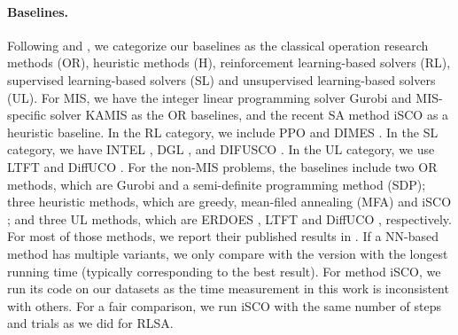 \paragraph{Baselines.}  Following \citet{qiu2022dimes} and \citet{zhang2023let}, we categorize our baselines as the classical operation research methods (OR), heuristic methods (H), reinforcement learning-based  solvers (RL), supervised learning-based solvers (SL) and unsupervised learning-based solvers (UL). For MIS, we have the integer linear programming solver Gurobi \citep{gurobi} and MIS-specific solver KAMIS \citep{kamis} as the OR baselines, and the recent SA method iSCO \citep{sun2023revisiting} as a heuristic baseline. In the RL category, we include PPO \citep{10.5555/3524938.3524952} and DIMES \citep{qiu2022dimes}.  In the SL category, we have  
INTEL \citep{NEURIPS2018_8d3bba74}, DGL \citep{bother2022whats}, and DIFUSCO \citep{sun2023difusco}. In the UL category, we use LTFT \citep{zhang2023let} and DiffUCO \citep{SanokowskiHL24}. For the non-MIS problems, the baselines include two OR methods, which are Gurobi and a semi-definite programming method (SDP); three heuristic methods, which are greedy, mean-filed annealing (MFA) \citep{NIPS1988_ec5decca} and iSCO \citep{sun2023revisiting}; and three UL methods, which are ERDOES \citep{Erdos1984OnTE}, LTFT \citep{zhang2023let} and DiffUCO \citep{SanokowskiHL24}, respectively. For most of those methods, we report their published results in \citet{qiu2022dimes, zhang2023let, sun2023difusco, SanokowskiHL24, li2024fast}. If a NN-based method has multiple variants, we only compare with the version with the longest running time (typically corresponding to the best result). For method iSCO, we run its code on our datasets as the time measurement in this work is inconsistent with others.  For a fair comparison, we run iSCO with the same number of steps and trials as we did for RLSA. 

